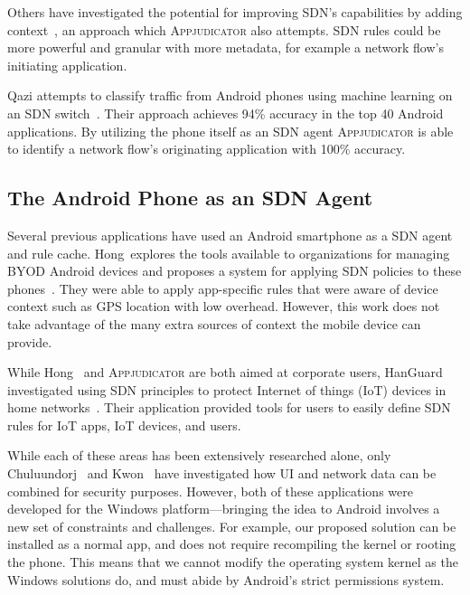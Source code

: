 Others have investigated the potential for improving SDN's capabilities by
adding context~\cite{yang2015}, an approach which \textsc{Appjudicator} also
attempts. SDN rules could be more powerful and granular with more metadata, for
example a network flow's initiating application.

Qazi \etal attempts to classify traffic from Android phones using machine
learning on an SDN switch~\cite{qazi2013}. Their approach achieves 94\%
accuracy in the top 40 Android applications. By utilizing the phone itself as
an SDN agent \textsc{Appjudicator} is able to identify a network flow's
originating application with 100\% accuracy.

\subsection{The Android Phone as an SDN Agent}
\label{sec:the-android-phone-as-an-sdn-agent}

Several previous applications have used an Android smartphone as a SDN agent and
rule cache. Hong~\etal explores the tools available to organizations for
managing BYOD Android devices and proposes a system for applying SDN policies to
these phones~\cite{hong2016}. They were able to apply app-specific rules that
were aware of device context such as GPS location with low overhead. However,
this work does not take advantage of the many extra sources of context the
mobile device can provide.

While Hong~\etal \cite{hong2016} and \textsc{Appjudicator} are both aimed at
corporate users, HanGuard investigated using SDN principles to protect Internet
of things (IoT) devices in home networks~\cite{demetriou2017}. Their application
provided tools for users to easily define SDN rules for IoT apps, IoT devices,
and users.

While each of these areas has been extensively researched alone, only
Chuluundorj~\cite{chuluundorj2019} and Kwon~\etal \cite{kwon2011} have
investigated how UI and network data can be combined for security purposes.
However, both of these applications were developed for the Windows
platform---bringing the idea to Android involves a new set of constraints and
challenges. For example, our proposed solution can be installed as a normal app,
and does not require recompiling the kernel or rooting the phone. This means
that we cannot modify the operating system kernel as the Windows solutions do,
and must abide by Android's strict permissions system.

\newpage

